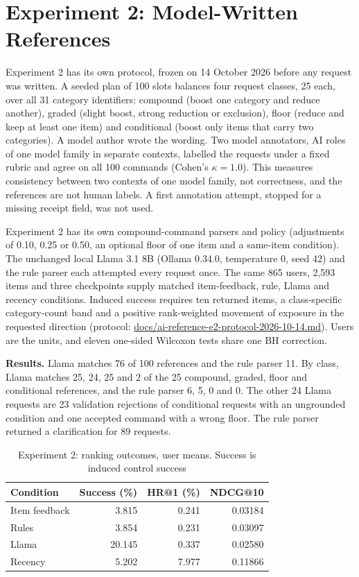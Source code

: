 \documentclass[conference]{IEEEtran}
\begin{document}
\section{Experiment 2: Model-Written References}
Experiment 2 has its own protocol, frozen on 14 October 2026 before any request was written. A seeded plan of 100 slots balances four request classes, 25 each, over all 31 category identifiers: compound (boost one category and reduce another), graded (slight boost, strong reduction or exclusion), floor (reduce and keep at least one item) and conditional (boost only items that carry two categories). A model author wrote the wording. Two model annotators, AI roles of one model family in separate contexts, labelled the requests under a fixed rubric and agree on all 100 commands (Cohen's $\kappa=1.0$). This measures consistency between two contexts of one model family, not correctness, and the references are not human labels. A first annotation attempt, stopped for a missing receipt field, was not used.

Experiment 2 has its own compound-command parsers and policy (adjustments of 0.10, 0.25 or 0.50, an optional floor of one item and a same-item condition). The unchanged local Llama 3.1 8B (Ollama 0.34.0, temperature 0, seed 42) and the rule parser each attempted every request once. The same 865 users, 2,593 items and three checkpoints supply matched item-feedback, rule, Llama and recency conditions. Induced success requires ten returned items, a class-specific category-count band and a positive rank-weighted movement of exposure in the requested direction (protocol: \url{docs/ai-reference-e2-protocol-2026-10-14.md}). Users are the units, and eleven one-sided Wilcoxon tests share one BH correction.

\textbf{Results.} Llama matches 76 of 100 references and the rule parser 11. By class, Llama matches 25, 24, 25 and 2 of the 25 compound, graded, floor and conditional references, and the rule parser 6, 5, 0 and 0. The other 24 Llama requests are 23 validation rejections of conditional requests with an ungrounded condition and one accepted command with a wrong floor. The rule parser returned a clarification for 89 requests.

\begin{table}[t]\centering\footnotesize
\caption{Experiment 2: ranking outcomes, user means. Success is induced control success}\label{tab:airank}
\begin{tabular}{lrrr}\toprule
Condition & Success (\%) & HR@1 (\%) & NDCG@10\\\midrule
Item feedback & 3.815 & 0.241 & 0.03184\\
Rules & 3.854 & 0.231 & 0.03097\\
Llama & 20.145 & 0.337 & 0.02580\\
Recency & 5.202 & 7.977 & 0.11866\\
\bottomrule
\end{tabular}\end{table}
\end{document}
